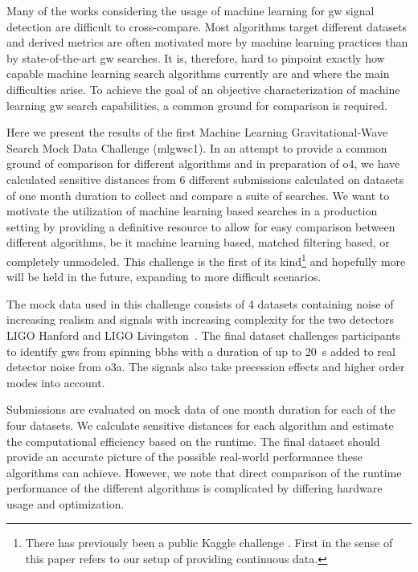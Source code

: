 Many of the works considering the usage of machine learning for \acrshort{gw} signal detection are difficult to cross-compare. Most algorithms target different datasets and derived metrics are often motivated more by machine learning practices than by state-of-the-art \acrshort{gw} searches. It is, therefore, hard to pinpoint exactly how capable machine learning search algorithms currently are and where the main difficulties arise. To achieve the goal of an objective characterization of machine learning \acrshort{gw} search capabilities, a common ground for comparison is required.

Here we present the results of the first Machine Learning Gravitational-Wave Search Mock Data Challenge (\acrshort{mlgwsc1}). In an attempt to provide a common ground of comparison for different algorithms and in preparation of \acrshort{o4}, we have calculated sensitive distances from 6 different submissions calculated on datasets of one month duration to collect and compare a suite of searches. We want to motivate the utilization of machine learning based searches in a production setting by providing a definitive resource to allow for easy comparison between different algorithms, be it machine learning based, matched filtering based, or completely unmodeled. This challenge is the first of its kind\footnote{There has previously been a public Kaggle challenge \cite{EGO:2021aaa}. First in the sense of this paper refers to our setup of providing continuous data.} and hopefully more will be held in the future, expanding to more difficult scenarios.

The mock data used in this challenge consists of 4 datasets containing noise of increasing realism and signals with increasing complexity for the two detectors LIGO Hanford and LIGO Livingston~\cite{LIGOScientific:2014pky}. The final dataset challenges participants to identify \acrshort{gw}s from spinning \acrshort{bbh}s with a duration of up to \SI{20}{\second} added to real detector noise from \acrshort{o3a}. The signals also take precession effects and higher order modes into account.

Submissions are evaluated on mock data of one month duration for each of the four datasets. We calculate sensitive distances for each algorithm and estimate the computational efficiency based on the runtime. The final dataset should provide an accurate picture of the possible real-world performance these algorithms can achieve. However, we note that direct comparison of the runtime performance of the different algorithms is complicated by differing hardware usage and optimization.

